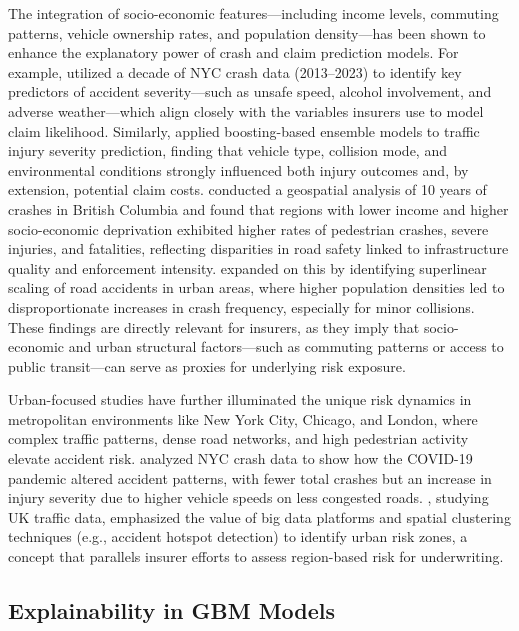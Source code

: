 \documentclass[
  number,
  review,
  3p]{elsarticle}
\begin{document}
The integration of socio-economic features---including income levels,
commuting patterns, vehicle ownership rates, and population
density---has been shown to enhance the explanatory power of crash and
claim prediction models. For example, \citet{adeniyi} utilized a decade
of NYC crash data (2013--2023) to identify key predictors of accident
severity---such as unsafe speed, alcohol involvement, and adverse
weather---which align closely with the variables insurers use to model
claim likelihood. Similarly, \citet{dong} applied boosting-based
ensemble models to traffic injury severity prediction, finding that
vehicle type, collision mode, and environmental conditions strongly
influenced both injury outcomes and, by extension, potential claim
costs. \citet{brubacher} conducted a geospatial analysis of 10 years of
crashes in British Columbia and found that regions with lower income and
higher socio-economic deprivation exhibited higher rates of pedestrian
crashes, severe injuries, and fatalities, reflecting disparities in road
safety linked to infrastructure quality and enforcement intensity.
\citet{cabrera} expanded on this by identifying superlinear scaling of
road accidents in urban areas, where higher population densities led to
disproportionate increases in crash frequency, especially for minor
collisions. These findings are directly relevant for insurers, as they
imply that socio-economic and urban structural factors---such as
commuting patterns or access to public transit---can serve as proxies
for underlying risk exposure.

Urban-focused studies have further illuminated the unique risk dynamics
in metropolitan environments like New York City, Chicago, and London,
where complex traffic patterns, dense road networks, and high pedestrian
activity elevate accident risk. \citet{adeniyi} analyzed NYC crash data
to show how the COVID-19 pandemic altered accident patterns, with fewer
total crashes but an increase in injury severity due to higher vehicle
speeds on less congested roads. \citet{feng}, studying UK traffic data,
emphasized the value of big data platforms and spatial clustering
techniques (e.g., accident hotspot detection) to identify urban risk
zones, a concept that parallels insurer efforts to assess region-based
risk for underwriting.

\subsection{\texorpdfstring{\textbf{Explainability in GBM
Models}}{Explainability in GBM Models}}\label{explainability-in-gbm-models}
\end{document}

